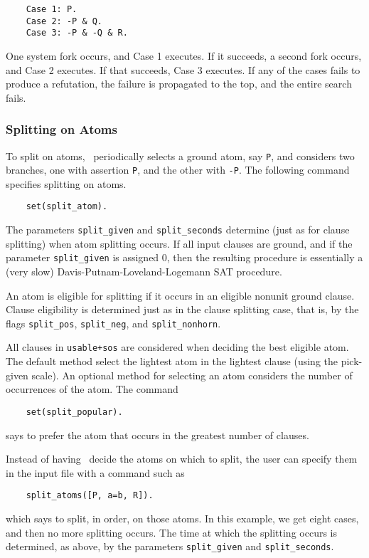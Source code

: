 \documentclass[11pt]{article}
\begin{document}
{\small
\begin{verbatim}
    Case 1: P.
    Case 2: -P & Q.
    Case 3: -P & -Q & R.
\end{verbatim}
}
\noindent
One system fork occurs, and Case 1 executes.  If it succeeds,
a second fork occurs, and Case 2 executes.  If that succeeds,
Case 3 executes.  If any of the cases fails to produce a
refutation, the failure is propagated to the top, and the entire
search fails.

\subsubsection{Splitting on Atoms}

To split on atoms, \otter\ periodically selects a ground
atom, say \verb:P:, and considers two branches, one with
assertion \verb:P:, and the other with \verb:-P:.  The following
command specifies splitting on atoms.

{\small
\begin{verbatim}
    set(split_atom).
\end{verbatim}
}
\noindent
The parameters \verb:split_given: and \verb:split_seconds:
determine (just as for clause splitting) when atom splitting
occurs.
If all input clauses are ground, and if the parameter
\verb:split_given: is assigned 0, then the resulting procedure
is essentially a (very slow) Davis-Putnam-Loveland-Logemann SAT procedure.

An atom is eligible for splitting if it occurs in
an eligible nonunit ground clause.  Clause eligibility
is determined just as in the clause splitting case, that
is, by the flags \verb:split_pos:, \verb:split_neg:, and
\verb:split_nonhorn:.

All clauses in \verb:usable+sos: are considered when deciding
the best eligible atom.
The default method select the
lightest atom in the lightest clause (using the pick-given scale).  An
optional method for selecting an atom considers the number of
occurrences of the atom.  The command

{\small
\begin{verbatim}
    set(split_popular).
\end{verbatim}
}
\noindent
says to prefer the atom that occurs in the greatest number
of clauses.

Instead of having \otter\ decide the atoms on which to split,
the user can specify them in the input file with a command such as

{\small
\begin{verbatim}
    split_atoms([P, a=b, R]).
\end{verbatim}
}
\noindent
which says to split, in order, on those atoms.  In this example,
we get eight cases, and then no more splitting occurs.  The
time at which the splitting occurs is determined, as above,
by the parameters \verb:split_given: and \verb:split_seconds:.
\end{document}
